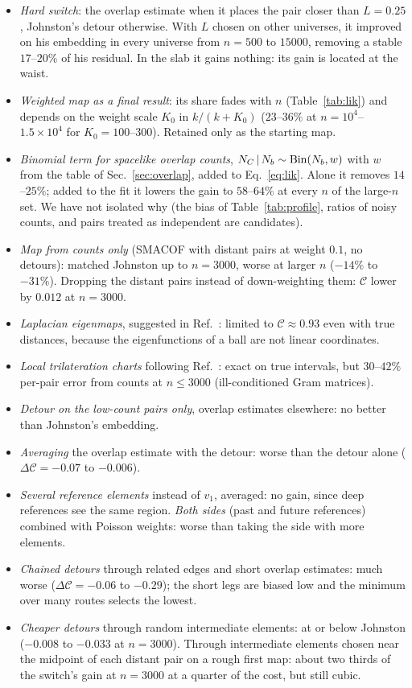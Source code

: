 \documentclass[prd,twocolumn,superscriptaddress,nofootinbib,amsmath,amssymb,floatfix]{revtex4-2}
\begin{document}
\begin{itemize}
\item \emph{Hard switch}: the overlap estimate when it places the pair closer than $L=0.25$, Johnston's detour otherwise. With $L$ chosen on other universes, it improved on his embedding in every universe from $n=500$ to $15000$, removing a stable $17$--$20\%$ of his residual. In the slab it gains nothing: its gain is located at the waist.
\item \emph{Weighted map as a final result}: its share fades with $n$ (Table~\ref{tab:lik}) and depends on the weight scale $K_0$ in $k/(k+K_0)$ ($23$--$36\%$ at $n=10^4$--$1.5\times10^4$ for $K_0=100$--$300$). Retained only as the starting map.
\item \emph{Binomial term for spacelike overlap counts}, $N_C\,|\,N_b\sim{\rm Bin}(N_b,w)$ with $w$ from the table of Sec.~\ref{sec:overlap}, added to Eq.~\eqref{eq:lik}. Alone it removes $14$--$25\%$; added to the fit it lowers the gain to $58$--$64\%$ at every $n$ of the large-$n$ set. We have not isolated why (the bias of Table~\ref{tab:profile}, ratios of noisy counts, and pairs treated as independent are candidates).
\item \emph{Map from counts only} (SMACOF with distant pairs at weight $0.1$, no detours): matched Johnston up to $n=3000$, worse at larger $n$ ($-14\%$ to $-31\%$). Dropping the distant pairs instead of down-weighting them: $\mathcal C$ lower by $0.012$ at $n=3000$.
\item \emph{Laplacian eigenmaps}, suggested in Ref.~\cite{BK24}: limited to $\mathcal C\approx0.93$ even with true distances, because the eigenfunctions of a ball are not linear coordinates.
\item \emph{Local trilateration charts} following Ref.~\cite{Madsen26}: exact on true intervals, but $30$--$42\%$ per-pair error from counts at $n\le3000$ (ill-conditioned Gram matrices).
\item \emph{Detour on the low-count pairs only}, overlap estimates elsewhere: no better than Johnston's embedding.
\item \emph{Averaging} the overlap estimate with the detour: worse than the detour alone ($\Delta\mathcal C=-0.07$ to $-0.006$).
\item \emph{Several reference elements} instead of $v_1$, averaged: no gain, since deep references see the same region. \emph{Both sides} (past and future references) combined with Poisson weights: worse than taking the side with more elements.
\item \emph{Chained detours} through related edges and short overlap estimates: much worse ($\Delta\mathcal C=-0.06$ to $-0.29$); the short legs are biased low and the minimum over many routes selects the lowest.
\item \emph{Cheaper detours} through random intermediate elements: at or below Johnston ($-0.008$ to $-0.033$ at $n=3000$). Through intermediate elements chosen near the midpoint of each distant pair on a rough first map: about two thirds of the switch's gain at $n=3000$ at a quarter of the cost, but still cubic.
\end{itemize}
\end{document}
